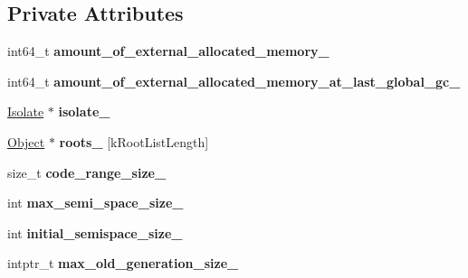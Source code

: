 \subsection*{Private Attributes}
\begin{DoxyCompactItemize}
\item 
int64\+\_\+t {\bfseries amount\+\_\+of\+\_\+external\+\_\+allocated\+\_\+memory\+\_\+}\hypertarget{classv8_1_1internal_1_1_heap_a0034f612065ad0657c5e300d44412e06}{}\label{classv8_1_1internal_1_1_heap_a0034f612065ad0657c5e300d44412e06}

\item 
int64\+\_\+t {\bfseries amount\+\_\+of\+\_\+external\+\_\+allocated\+\_\+memory\+\_\+at\+\_\+last\+\_\+global\+\_\+gc\+\_\+}\hypertarget{classv8_1_1internal_1_1_heap_a80934d81e7cbb2ce76521d6be9eb55c9}{}\label{classv8_1_1internal_1_1_heap_a80934d81e7cbb2ce76521d6be9eb55c9}

\item 
\hyperlink{classv8_1_1internal_1_1_isolate}{Isolate} $\ast$ {\bfseries isolate\+\_\+}\hypertarget{classv8_1_1internal_1_1_heap_a2cd0c6366709d65b493eb14c1ea5e52a}{}\label{classv8_1_1internal_1_1_heap_a2cd0c6366709d65b493eb14c1ea5e52a}

\item 
\hyperlink{classv8_1_1internal_1_1_object}{Object} $\ast$ {\bfseries roots\+\_\+} \mbox{[}k\+Root\+List\+Length\mbox{]}\hypertarget{classv8_1_1internal_1_1_heap_a7ba24e4e2ffee051da52310fe5077cbc}{}\label{classv8_1_1internal_1_1_heap_a7ba24e4e2ffee051da52310fe5077cbc}

\item 
size\+\_\+t {\bfseries code\+\_\+range\+\_\+size\+\_\+}\hypertarget{classv8_1_1internal_1_1_heap_aecdce1d8c0f22188198e9c17aef506f7}{}\label{classv8_1_1internal_1_1_heap_aecdce1d8c0f22188198e9c17aef506f7}

\item 
int {\bfseries max\+\_\+semi\+\_\+space\+\_\+size\+\_\+}\hypertarget{classv8_1_1internal_1_1_heap_a969298242a48e2836bafdcc98b96c78e}{}\label{classv8_1_1internal_1_1_heap_a969298242a48e2836bafdcc98b96c78e}

\item 
int {\bfseries initial\+\_\+semispace\+\_\+size\+\_\+}\hypertarget{classv8_1_1internal_1_1_heap_a22db9a3a6086f1aea6b9c6b71bd24600}{}\label{classv8_1_1internal_1_1_heap_a22db9a3a6086f1aea6b9c6b71bd24600}

\item 
intptr\+\_\+t {\bfseries max\+\_\+old\+\_\+generation\+\_\+size\+\_\+}\hypertarget{classv8_1_1internal_1_1_heap_a066c03a50ab410cc6f58e06cb5c7bde1}{}\label{classv8_1_1internal_1_1_heap_a066c03a50ab410cc6f58e06cb5c7bde1}


\end{DoxyCompactItemize}
